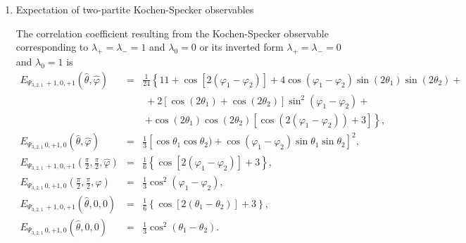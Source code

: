 \documentclass[fleqn,twoside]{article}      %
\begin{document}
\begin{enumerate}
\item{Expectation of two-partite Kochen-Specker observables}

The correlation coefficient resulting from the Kochen-Specker observable corresponding to
$\lambda_+ = \lambda_- = 1$ and $\lambda_0 = 0$ or its inverted form
$\lambda_+ = \lambda_- = 0$ and $\lambda_0 = 1$
is
\begin{equation}
\begin{array}{rcl}
E_{{ \Psi_{3,2,1}}\,+1, 0, +1 } ({\hat \theta},{\hat \varphi} )&=&
\frac{1}{24} \left\{
11
+\cos [2 (\varphi_1-\varphi_2)]
+4 \cos (\varphi_1-\varphi_2) \sin (2  \theta_1 ) \sin (2  \theta_2 ) +  \right.
\\
&&\;
+2 \left[\cos (2  \theta_1 )+\cos (2 \theta_2) \right] \sin ^2(\varphi_1-\varphi_2)+
\\
&&\; \left.
+\cos (2  \theta_1 )   \cos (2  \theta_2 ) \left[ \cos (2 (\varphi_1-\varphi_2))+3\right]\right\},
\\
E_{{ \Psi_{3,2,1}}\, 0, +1, 0 } ({\hat \theta},{\hat \varphi} )&=&
\frac{1}{3} \left[\cos \theta_1  \cos \theta_2)+\cos    (\varphi_1-\varphi_2) \sin  \theta_1  \sin  \theta_2 \right]^2 ,
\\
E_{{ \Psi_{3,2,1}}\,+1, 0, +1 } (\frac{\pi}{2},\frac{\pi}{2},{\hat \varphi} )&=&
\frac{1}{6} \left\{\cos \left[2 (\varphi_1-\varphi_2)\right]+3\right\},
\\
E_{{ \Psi_{3,2,1}}\, 0, +1, 0 } (\frac{\pi}{2},\frac{\pi}{2},{\hat \varphi} )&=&
\frac{1}{3} \cos ^2(\varphi_1-\varphi_2),
\\
E_{{ \Psi_{3,2,1}}\,+1, 0, +1 } ({\hat \theta},0,0 )&=&
\frac{1}{6} \left\{\cos \left[2 ( \theta_1 - \theta_2 )\right]+3\right\},
\\
E_{{ \Psi_{3,2,1}}\, 0, +1, 0 } ({\hat \theta},0,0 )&=&
\frac{1}{3} \cos ^2( \theta_1 - \theta_2 ).
\end{array}
\label{2009-gtq-edosgc3ks}
\end{equation}

\end{enumerate}
\end{document}
